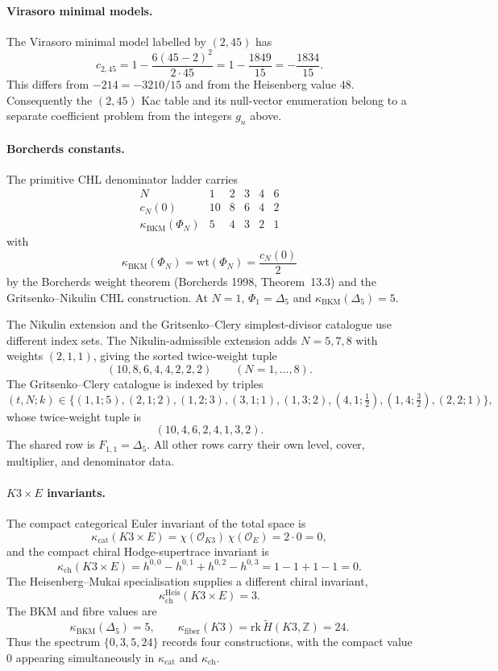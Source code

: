 \paragraph{Virasoro minimal models.}
The Virasoro minimal model labelled by $(2,45)$ has
\[
  c_{2,45}
  =
  1-\frac{6(45-2)^2}{2\cdot45}
  =
  1-\frac{1849}{15}
  =
  -\frac{1834}{15}.
\]
This differs from $-214=-3210/15$ and from the Heisenberg value $48$.
Consequently the $(2,45)$ Kac table and its null-vector enumeration
belong to a separate coefficient problem from the integers $g_n$ above.

\paragraph{Borcherds constants.}
The primitive CHL denominator ladder carries
\[
\begin{array}{c|ccccc}
N & 1 & 2 & 3 & 4 & 6\\ \hline
c_N(0) & 10 & 8 & 6 & 4 & 2\\
\kappa_{\mathrm{BKM}}(\Phi_N) & 5 & 4 & 3 & 2 & 1
\end{array}
\]
with
\[
  \kappa_{\mathrm{BKM}}(\Phi_N)=\mathrm{wt}(\Phi_N)=\frac{c_N(0)}{2}
\]
by the Borcherds weight theorem (Borcherds 1998, Theorem~13.3) and the
Gritsenko--Nikulin CHL construction. At \(N=1\), \(\Phi_1=\Delta_5\)
and \(\kappa_{\mathrm{BKM}}(\Delta_5)=5\).

The Nikulin extension and the Gritsenko--Clery simplest-divisor
catalogue use different index sets. The Nikulin-admissible extension
adds \(N=5,7,8\) with weights \((2,1,1)\), giving the sorted
twice-weight tuple
\[
  (10,8,6,4,4,2,2,2)\qquad (N=1,\ldots,8).
\]
The Gritsenko--Clery catalogue is indexed by triples
\[
  (t,N;k)\in
  \bigl\{(1,1;5),(2,1;2),(1,2;3),(3,1;1),
  (1,3;2),(4,1;\tfrac12),(1,4;\tfrac32),(2,2;1)\bigr\},
\]
whose twice-weight tuple is
\[
  (10,4,6,2,4,1,3,2).
\]
The shared row is \(F_{1,1}=\Delta_5\). All other rows carry their own
level, cover, multiplier, and denominator data.

\paragraph{\texorpdfstring{$K3\times E$}{K3 x E} invariants.}
The compact categorical Euler invariant of the total space is
\[
  \kappa_{\mathrm{cat}}(K3\times E)
  =
  \chi(\mathcal O_{K3})\,\chi(\mathcal O_E)=2\cdot0=0,
\]
and the compact chiral Hodge-supertrace invariant is
\[
  \kappa_{\mathrm{ch}}(K3\times E)
  =
  h^{0,0}-h^{0,1}+h^{0,2}-h^{0,3}
  =
  1-1+1-1=0.
\]
The Heisenberg--Mukai specialisation supplies a different chiral
invariant,
\[
  \kappa_{\mathrm{ch}}^{\mathrm{Heis}}(K3\times E)=3.
\]
The BKM and fibre values are
\[
  \kappa_{\mathrm{BKM}}(\Delta_5)=5,\qquad
  \kappa_{\mathrm{fiber}}(K3)=\mathrm{rk}\,\widetilde H(K3,\mathbb Z)
  =24.
\]
Thus the spectrum \(\{0,3,5,24\}\) records four constructions, with the
compact value \(0\) appearing simultaneously in \(\kappa_{\mathrm{cat}}\)
and \(\kappa_{\mathrm{ch}}\).

